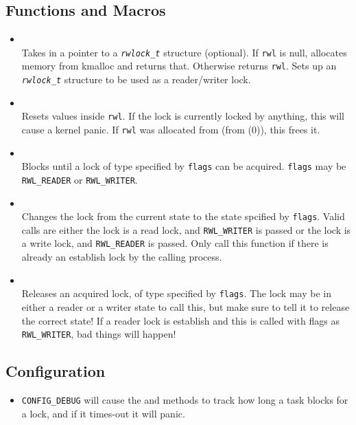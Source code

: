 \subsection{Functions and Macros}

\begin{itemize}
\item {} \\
Takes in a pointer to a \texttt{\textit{rwlock\_t}} structure (optional). If \texttt{rwl} is null, allocates
memory from kmalloc and returns that. Otherwise returns \texttt{rwl}. Sets up an \texttt{\textit{rwlock\_t}}
structure to be used as a reader/writer lock.

\item {} \\
Resets values inside \texttt{rwl}. If the lock is currently locked by anything,
this will cause a kernel panic. If \texttt{rwl} was allocated from  (from (0)), this frees it.

\item {} \\
Blocks until a lock of type specified by \texttt{flags} can be acquired. \texttt{flags} may
be \texttt{RWL\_READER} or \texttt{RWL\_WRITER}. 
\item {} \\
Changes the lock from the current state to the state spcified by \texttt{flags}. Valid calls are either
the lock is a read lock, and \texttt{RWL\_WRITER} is passed or the lock is a write lock, and \texttt{RWL\_READER}
is passed. Only call this function if there is already an establish lock by the calling process.
\item {} \\
Releases an acquired lock, of type specified by \texttt{flags}. The lock may be in either a reader or a writer state to call this, but
make sure to tell it to release the correct state! If a reader lock is establish and this is called
with flags as \texttt{RWL\_WRITER}, bad things will happen!
\end{itemize}

\subsection{Configuration}
\begin{itemize}
\item \texttt{CONFIG\_DEBUG} will cause the  and 
methods to track how long a task blocks for a lock, and if it times-out it will panic.
\end{itemize}

